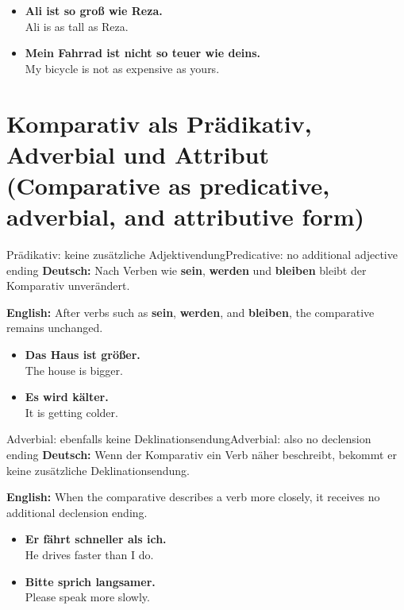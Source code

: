 \documentclass[a4paper,11pt]{article}
\newcommand{\GermanText}[1]{\textbf{Deutsch: }#1\par}
\newcommand{\EnglishText}[1]{{\small\color{SoftGray}\textbf{English: }#1\par}}
\newcommand{\ExampleItem}[2]{\item \textbf{#1}\\{\small\color{SoftGray}#2}}
\begin{document}
      \begin{exbox}
         \begin{itemize}
            \ExampleItem{Ali ist so groß wie Reza.}{Ali is as tall as Reza.}
            \ExampleItem{Mein Fahrrad ist nicht so teuer wie deins.}{My bicycle is not as expensive as yours.}
         \end{itemize}
      \end{exbox}

   \section{Komparativ als Prädikativ, Adverbial und Attribut \textnormal{(Comparative as predicative, adverbial, and attributive form)}}

      \begin{grammarentry}{Prädikativ: keine zusätzliche Adjektivendung}{Predicative: no additional adjective ending}
         \GermanText{Nach Verben wie \textbf{sein}, \textbf{werden} und \textbf{bleiben} bleibt der Komparativ unverändert.}
         \EnglishText{After verbs such as \textbf{sein}, \textbf{werden}, and \textbf{bleiben}, the comparative remains unchanged.}
      \end{grammarentry}

      \begin{exbox}
         \begin{itemize}
            \ExampleItem{Das Haus ist größer.}{The house is bigger.}
            \ExampleItem{Es wird kälter.}{It is getting colder.}
         \end{itemize}
      \end{exbox}

      \begin{grammarentry}{Adverbial: ebenfalls keine Deklinationsendung}{Adverbial: also no declension ending}
         \GermanText{Wenn der Komparativ ein Verb näher beschreibt, bekommt er keine zusätzliche Deklinationsendung.}
         \EnglishText{When the comparative describes a verb more closely, it receives no additional declension ending.}
      \end{grammarentry}

      \begin{exbox}
         \begin{itemize}
            \ExampleItem{Er fährt schneller als ich.}{He drives faster than I do.}
            \ExampleItem{Bitte sprich langsamer.}{Please speak more slowly.}
         \end{itemize}
      \end{exbox}
\end{document}
